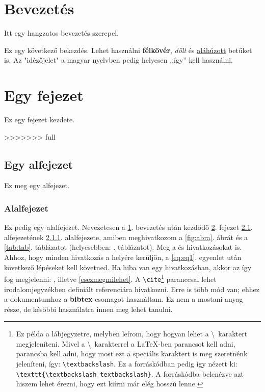 \documentclass[a4paper, 12pt]{article}
\numberwithin{equation}{section}          %
\numberwithin{figure}{subsection}
\begin{document}
\section{Bevezetés}
\label{sec:bev}
Itt egy hangzatos bevezetés szerepel.

Ez egy következő bekezdés. Lehet használni \textbf{félkövér}, \textit{dőlt} és 
\underline{aláhúzott} betűket is. Az "idézőjelet" a magyar nyelvben pedig helyesen ,,így'' 
kell használni.

\section{Egy fejezet}
\label{sec:fejezet}

Ez egy fejezet kezdete.

>>>>>>> full
\subsection{Egy alfejezet}
\label{subsec:alfejezet}

Ez meg egy alfejezet.

\subsubsection{Alalfejezet}
\label{subsubsec:alalfejezet}

Ez pedig egy alalfejezet. Nevezetesen a \ref{sec:bev}. bevezetés után kezdődő \ref{sec:fejezet}. fejezet \ref{subsec:alfejezet}. alfejezetének \ref{subsubsec:alalfejezet}. alalfejezete, amiben meghivatkozom a \ref{fig:abra}. ábrát és a \ref{tab:tab}. táblázatot (helyesebben: . táblázatot). Meg a \cite{artic:elso} és \cite{artic:masodik, artic:harmadik, artic:negyedik} hivatkozásokat is. Ahhoz, hogy minden hivatkozás a helyére kerüljön, a \ref{eq:eq1}. egyenlet után következő lépéseket kell követned. Ha hiba van egy hivatkozásban, akkor az így fog megjelenni: \cite{ezegynemletezohivatkozas}, illetve \ref{esezmegmilehet}. A \texttt{\textbackslash cite}\footnote{Ez példa a lábjegyzetre, melyben leírom, hogy hogyan lehet a \textbackslash\ karaktert megjeleníteni. Mivel a \textbackslash\ karakterrel a \LaTeX-ben parancsot kell adni, parancsba kell adni, hogy most ezt a speciális karaktert is meg szeretnénk jeleníteni, így: \texttt{\textbackslash textbackslash}. Ez a forráskódban pedig így nézett ki: \texttt{\textbackslash texttt\{\textbackslash textbackslash textbackslash\}}. A forráskódba belenézve azt hiszem lehet érezni, hogy ezt kiírni már elég hosszú lenne.} paranccsal lehet irodalomjegyzékben definiált referenciára hivatkozni. Erre is több mód van; ehhez a dokumentumhoz a \textbf{bibtex} csomagot használtam. Ez nem a mostani anyag része, de későbbi használatra innen meg lehet tanulni.
\end{document}
